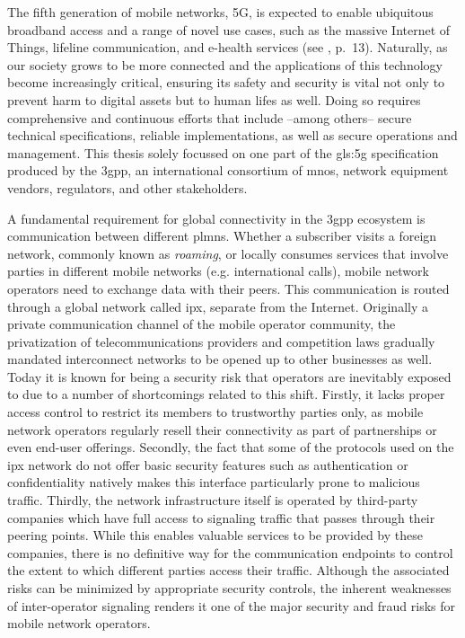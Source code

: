 The fifth generation of mobile networks, 5G, is expected to enable ubiquitous broadband access and a range of novel use cases, such as the massive Internet of Things, lifeline communication, and e-health services (see \cite{ngmn5Gwhite}, p.~13).
Naturally, as our society grows to be more connected and the applications of this technology become increasingly critical, ensuring its safety and security is vital not only to prevent harm to digital assets but to human lifes as well.
Doing so requires comprehensive and continuous efforts that include --among others-- secure technical specifications, reliable implementations, as well as secure operations and management.
This thesis solely focussed on one part of the \gls{gls:5g} specification produced by the \gls{3gpp}, an international consortium of \glspl{mno}, network equipment vendors, regulators, and other stakeholders.

A fundamental requirement for global connectivity in the \gls{3gpp} ecosystem is communication between different \glspl{plmn}.
Whether a subscriber visits a foreign network, commonly known as \textit{roaming}, or locally consumes services that involve parties in different mobile networks (e.g. international calls), mobile network operators need to exchange data with their peers.
This communication is routed through a global network called \gls{ipx}, separate from the Internet.
Originally a private communication channel of the mobile operator community, the privatization of telecommunications providers and competition laws gradually mandated interconnect networks to be opened up to other businesses as well.
Today it is known for being a security risk that operators are inevitably exposed to due to a number of shortcomings related to this shift.
Firstly, it lacks proper access control to restrict its members to trustworthy parties only, as mobile network operators regularly resell their connectivity as part of partnerships or even end-user offerings.
Secondly, the fact that some of the protocols used on the \gls{ipx} network do not offer basic security features such as authentication or confidentiality natively makes this interface particularly prone to malicious traffic.
Thirdly, the network infrastructure itself is operated by third-party companies which have full access to signaling traffic that passes through their peering points.
While this enables valuable services to be provided by these companies, there is no definitive way for the communication endpoints to control the extent to which different parties access their traffic.
Although the associated risks can be minimized by appropriate security controls, the inherent weaknesses of inter-operator signaling renders it one of the major security and fraud risks for mobile network operators.

